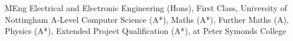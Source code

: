 %
%
%


\begin{scholarship}
					{MEng Electrical and Electronic Engineering (Hons), First Class, University of Nottingham}
					{A-Level Computer Science (A*), Maths (A*), Further Maths (A), Physics (A*), Extended Project Qualification (A*), at Peter Symonds College}
\end{scholarship}
